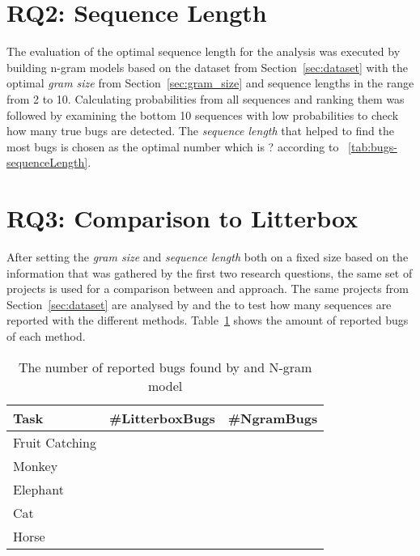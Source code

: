 

\section{RQ2: Sequence Length}\label{sec:sequence_length}
The evaluation of the optimal sequence length for the analysis was executed by building n-gram models based on the dataset from Section~\ref{sec:dataset} with the optimal \textit{gram size} from Section~\ref{sec:gram_size} and {sequence lengths} in the range from 2 to 10. Calculating probabilities from all sequences and ranking them was followed by examining the bottom 10 sequences with low probabilities to check how many true bugs are detected. The \textit{sequence length} that helped to find the most bugs is chosen as the optimal number which is ? according to ~\ref{tab:bugs-sequenceLength}. 



\section{RQ3: Comparison to Litterbox}\label{sec:litterbox}
After setting the \textit{gram size} and \textit{sequence length} both on a fixed size based on the information that was gathered by the first two research questions, the same set of projects is used for a comparison between \litterbox{} and \ngram{} approach. The same projects from Section~\ref{sec:dataset} are analysed by \litterbox{} and the \ngram{} to test how many sequences are reported with the different methods. Table~\ref{tab:litterbox} shows the amount of reported bugs of each method. 

\begin{table}[H]
    \centering
    \caption[The number of reported bugs found by \litterbox{} and N-gram model]{\label{tab:litterbox}The number of reported bugs found by \litterbox{} and N-gram model}
    \begin{tabular}{lrr}
        \toprule
        Task & \#LitterboxBugs & \#NgramBugs \\
        \midrule
        Fruit Catching &  &\\
        Monkey &  &  \\
        Elephant &  & \\
        Cat &  &  \\
        Horse & &  \\
        \bottomrule
    \end{tabular}
\end{table}
 
